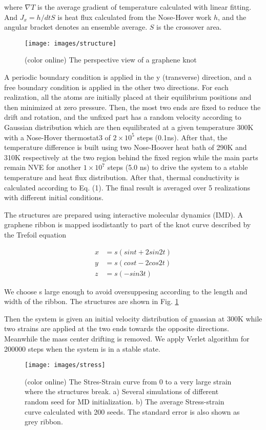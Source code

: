 \documentclass[%
 reprint,
 amsmath,amssymb,
 aps,
prb,
]{revtex4-1}
\begin{document}
where $\nabla T$ is the average gradient of temperature calculated with linear fitting. And $J_x=h/dt S$ is heat flux calculated from the Nose-Hover work $h$, and the angular bracket denotes an ensemble average. $S$ is the crossover area.
\begin{figure}[b]
  \texttt{[image: images/structure]}
  \caption{\label{fig:structure}  (color online) The perspective view of a graphene knot}
\end{figure}
A periodic boundary condition is applied in the y (transverse) direction, and a free boundary condition is applied in the other two directions. For each realization, all the atoms are initially placed at their equilibrium positions and then minimized at zero pressure. Then, the most two ends are fixed to reduce the drift and rotation, and the unfixed part has a random velocity according to Gaussian distribution which are then equilibrated at a given temperature 300K with a Nose-Hover thermostat3 of $2 \times10^5$ steps (0.1ns). After that, the temperature difference is built using two Nose-Hoover heat bath of 290K and 310K respectively at the two region behind the fixed region while the main parts remain NVE for another $1 \times10^7$ steps (5.0 ns) to drive the system to a stable temperature and heat flux distribution. After that, thermal conductivity is calculated according to Eq. (1). The final result is averaged over 5 realizations with different initial conditions.

The structures are prepared using interactive molecular dynamics (IMD). A graphene ribbon is mapped isodistantly to part of the knot curve described by the Trefoil equation

\begin{equation}
  \begin{aligned}
    x & = s(sin t+2 sin 2t) \\
    y & = s(cos t-2 cos 2t) \\
    z & = s(-sin 3t)
  \end{aligned}
\end{equation}

We choose s large enough to avoid oversuppesing according to the length and width of the ribbon. The structures are shown in Fig. \ref{fig:structure}



Then the system is given an initial velocity distribution of guassian at 300K while two strains are applied at the two ends towards the opposite directions. Meanwhile the mass center drifting is removed. We apply Verlet algorithm for 200000 steps when the system is in a stable state.
\begin{figure}[b]
  \texttt{[image: images/stress]}
  \caption{\label{fig:stress}  (color online) The Stres-Strain curve from 0 to a very large strain where the structures break. a) Several simulations of different random seed for MD initialization. b) The average Stress-strain curve calculated with 200 seeds. The standard error is also shown as grey ribbon.}
\end{figure}
\end{document}
